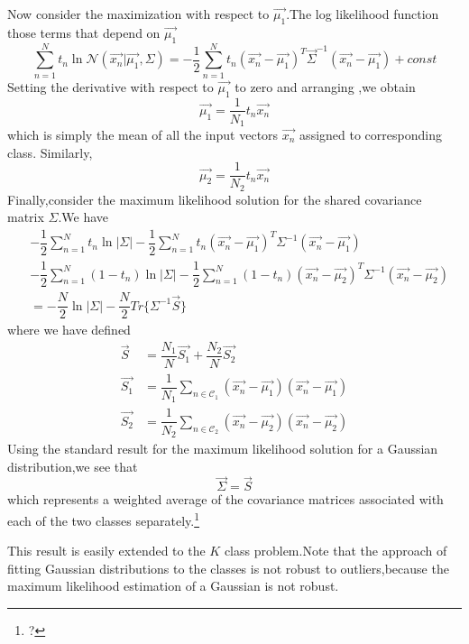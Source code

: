 Now consider the maximization with respect to $\vec{\mu_1}$.The log likelihood function those terms that depend on $\vec{\mu_1}$
\begin{equation}
\sum_{n=1}^{N}t_n\ln\mathcal{N}(\vec{x_n}|\vec{\mu_1},\Sigma) = 
-\dfrac{1}{2}\sum_{n=1}^{N}t_n(\vec{x_n} - \vec{\mu_1})^T\vec{\Sigma}^{-1}(\vec{x_n}-\vec{\mu_1})+ const
\end{equation}
Setting the derivative with respect to $\vec{\mu_1}$ to zero and arranging ,we obtain
\begin{equation}
\vec{\mu_1} = \dfrac{1}{N_1}t_n\vec{x_n}
\end{equation}
which is simply the mean of all the input vectors $\vec{x_n}$ assigned to corresponding class.
Similarly,
\begin{equation}
\vec{\mu_2} = \dfrac{1}{N_2}t_n\vec{x_n}
\end{equation}
Finally,consider the maximum likelihood solution for the shared covariance matrix $\Sigma$.We have
\begin{align}
&-\dfrac{1}{2}\sum_{n=1}^{N}t_n\ln|\Sigma| - 
\dfrac{1}{2}\sum_{n=1}^{N}t_n(\vec{x_n} - \vec{\mu_1})^T\Sigma^{-1}(\vec{x_n}-\vec{\mu_1}) \\
&-\dfrac{1}{2}\sum_{n=1}^{N}(1-t_n)\ln|\Sigma| - \dfrac{1}{2}\sum_{n=1}^{N}(1-t_n)(\vec{x_n}-\vec{\mu_2})^T\Sigma^{-1}(\vec{x_n}-\vec{\mu_2})\\
&= -\dfrac{N}{2}\ln|\Sigma| -\dfrac{N}{2}Tr\{\Sigma^{-1}\vec{S}\} 
\end{align}
where we have defined
\begin{align}
\vec{S} &= \dfrac{N_1}{N}\vec{S_1} + \dfrac{N_2}{N}\vec{S_2} \\
\vec{S_1}&= \dfrac{1}{N_1}\sum_{n\in \mathcal{C}_1}{(\vec{x_n}-\vec{\mu_1})(\vec{x_n}-\vec{\mu_1})} \\
\vec{S_2}&= \dfrac{1}{N_2}\sum_{n\in \mathcal{C}_2}{(\vec{x_n}-\vec{\mu_2})(\vec{x_n}-\vec{\mu_2})} 
\end{align}
Using the standard result for the maximum likelihood solution for a Gaussian distribution,we see that
\begin{equation}
\vec{\Sigma} = \vec{S}
\end{equation}
which represents a weighted average of the covariance matrices associated with each of the two classes separately.\footnote{?}

This result is easily extended to the $K$ class problem.Note that the approach of fitting Gaussian distributions to the classes is not robust to outliers,because the maximum likelihood estimation of a Gaussian is not robust.

